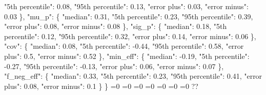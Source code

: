{{        "5th percentile": 0.08, %
        "95th percentile": 0.13, %
        "error plus": 0.03, %
        "error minus": 0.03%
      \}, %
      "mu\_p": \{%
        "median": 0.31, %
        "5th percentile": 0.23, %
        "95th percentile": 0.39, %
        "error plus": 0.08, %
        "error minus": 0.08%
      \}, %
      "sig\_p": \{%
        "median": 0.18, %
        "5th percentile": 0.12, %
        "95th percentile": 0.32, %
        "error plus": 0.14, %
        "error minus": 0.06%
      \}, %
      "cov": \{%
        "median": 0.08, %
        "5th percentile": {-}0.44, %
        "95th percentile": 0.58, %
        "error plus": 0.5, %
        "error minus": 0.52%
      \}, %
      "min\_eff": \{%
        "median": {-}0.19, %
        "5th percentile": {-}0.27, %
        "95th percentile": {-}0.13, %
        "error plus": 0.06, %
        "error minus": 0.07%
      \}, %
      "f\_neg\_eff": \{%
        "median": 0.33, %
        "5th percentile": 0.23, %
        "95th percentile": 0.41, %
        "error plus": 0.08, %
        "error minus": 0.1%
      \}%
    \}}%
  \else%
    \ifnum{}=0%
      \let\gaussianChiEffChiP@I@out\gaussianChiEffChiP@III%
    \else%
      \ifnum{}=0%
      \let\gaussianChiEffChiP@I@out\gaussianChiEffChiP@IV%
    \else%
      \ifnum{}=0%
      \let\gaussianChiEffChiP@I@out\gaussianChiEffChiP@V%
    \else%
      \ifnum{}=0%
      \let\gaussianChiEffChiP@I@out\gaussianChiEffChiP@VI%
    \else%
      \ifnum{}=0%
      \let\gaussianChiEffChiP@I@out\gaussianChiEffChiP@VII%
    \else%
      \ifnum{}=0%
      \let\gaussianChiEffChiP@I@out\gaussianChiEffChiP@VIII%
    \else%
      \ifnum{}=0%
      \let\gaussianChiEffChiP@I@out\gaussianChiEffChiP@IX%
    \else%
      \def\gaussianChiEffChiP@I@out{%
    ??}%
    \fi\fi\fi\fi\fi\fi\fi
  \fi
  \gaussianChiEffChiP@I@out
}\newcommand\gaussianChiEffChiP@II[1][all]{%
  \ifnum\pdfstrcmp{#1}{all}=0%
    \def\gaussianChiEffChiP@II@out{%
    \{%
      "chi\_eff": \{%
        "median": 0.05, %
        "5th percentile": {-}0.13, %
        "95th percentile": 0.22, %
        "spin at peak": 0.05%
      \}, %
      "chi\_p": \{%
        "median": 0.33, %
        "5th percentile": 0.07, %
        "95th percentile": 0.65, %
        "spin at peak": 0.31%
      \}%
    \}}%
  \else%
    \ifnum\pdfstrcmp{#1}{chi_eff}=0%
      \let\gaussianChiEffChiP@II@out\gaussianChiEffChiP@X%
    \else%
      \ifnum\pdfstrcmp{#1}{chi_p}=0%
      \let\gaussianChiEffChiP@II@out\gaussianChiEffChiP@XI%
}
